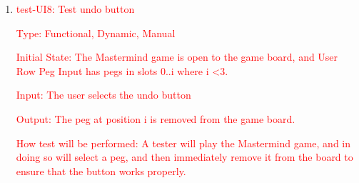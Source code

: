 \documentclass[12pt, titlepage]{article}
\begin{document}
\begin{enumerate}
\item{\textcolor{red}{test-UI8: Test undo button}\\}

\textcolor{red}{
Type: Functional, Dynamic, Manual}

\textcolor{red}{Initial State: The Mastermind game is open to the game board, and User Row Peg Input has pegs in slots 0..i where i \textless 3. }

\textcolor{red}{Input: The user selects the undo button}

\textcolor{red}{Output: The peg at position i is removed from the game board.}

\textcolor{red}{How test will be performed: A tester will play the Mastermind game, and in doing so will select a peg, and then immediately remove it from the board to ensure that the button works properly.
}
\end{enumerate}
\end{document}

